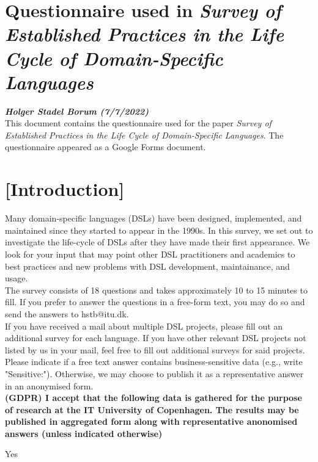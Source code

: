 \documentclass{article}
\begin{document}
\section*{Questionnaire used in \textit{Survey of Established Practices in the Life Cycle of Domain-Specific Languages}}
\textbf{\textit{Holger Stadel Borum (7/7/2022)}} \\

This document contains the questionnaire used for the paper \textit{Survey of Established Practices in the Life Cycle of Domain-Specific Languages}. The questionnaire appeared as a Google Forms document.

\section*{[Introduction]}

Many domain-specific languages (DSLs) have been designed, implemented, and maintained since they started to appear in the 1990s. In this survey, we set out to investigate the life-cycle of DSLs after they have made their first appearance. We look for your input that may point other DSL practitioners and academics to best practices and new problems with DSL development, maintainance, and usage. \\

The survey consists of 18 questions and takes approximately 10 to 15 minutes to fill. If you prefer to answer the questions in a free-form text, you may do so and send the answers to hstb@itu.dk.\\

If you have received a mail about multiple DSL projects, please fill out an additional survey for each language. If you have other relevant DSL projects not listed by us in your mail, feel free to fill out additional surveys for said projects. \\

Please indicate if a free text answer contains business-sensitive data (e.g., write "Sensitive:"). Otherwise, we may choose to publish it as a representative answer in an anonymised form. \\

\textbf{(GDPR) I accept that the following data is gathered for the purpose of research at the IT University of Copenhagen. The results may be published in aggregated form along with representative anonomised answers (unless indicated otherwise)}

\begin{checklist}
  \item Yes
\end{checklist}
\vspace{0.5cm}
\end{document}
